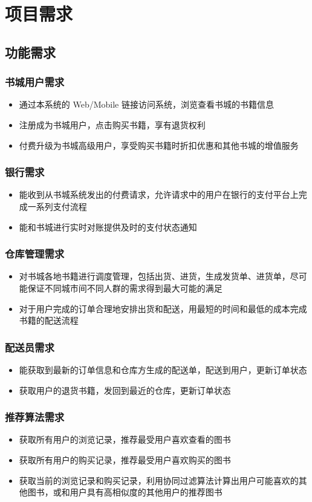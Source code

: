 \chapter{项目需求}
\section{功能需求}
\subsection{书城用户需求}
\begin{itemize}
	\item 通过本系统的 Web/Mobile 链接访问系统，浏览查看书城的书籍信息
	\item 注册成为书城用户，点击购买书籍，享有退货权利
	\item 付费升级为书城高级用户，享受购买书籍时折扣优惠和其他书城的增值服务
\end{itemize}
\subsection{银行需求}
\begin{itemize}
	\item 能收到从书城系统发出的付费请求，允许请求中的用户在银行的支付平台上完成一系列支付流程
	\item 能和书城进行实时对账提供及时的支付状态通知
\end{itemize}
\subsection{仓库管理需求}
\begin{itemize}
	\item 对书城各地书籍进行调度管理，包括出货、进货，生成发货单、进货单，尽可能保证不同城市间不同人群的需求得到最大可能的满足
	\item 对于用户完成的订单合理地安排出货和配送，用最短的时间和最低的成本完成书籍的配送流程
\end{itemize}
\subsection{配送员需求}
\begin{itemize}
	\item 能获取到最新的订单信息和仓库方生成的配送单，配送到用户，更新订单状态
	\item 获取用户的退货书籍，发回到最近的仓库，更新订单状态
\end{itemize}
\subsection{推荐算法需求}
\begin{itemize}
	\item 获取所有用户的浏览记录，推荐最受用户喜欢查看的图书
	\item 获取所有用户的购买记录，推荐最受用户喜欢购买的图书
	\item 获取当前的浏览记录和购买记录，利用协同过滤算法计算出用户可能喜欢的其他图书，或和用户具有高相似度的其他用户的推荐图书
\end{itemize}
